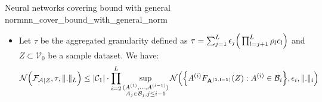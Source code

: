 \begin{theorem}{Neural networks covering bound with general norm}{nn_cover_bound_with_general_norm}
\begin{itemize}
        \item Let $\tau$ be the aggregated granularity defined as $\tau = \sum_{j=1}^L \epsilon_j \Big( \prod_{l=j+1}^L \rho_lc_l \Big)$ and $Z\subset\mathcal{V}_0$ be a sample dataset. We have:
        \begin{align*}
            \mathcal{N}\Big( 
                {\mathcal{F}_\mathcal{A}}_{|Z}, \tau, \|.\|_L
             \Big) \le |\mathcal{C}_1|\cdot\prod_{i=2}^L \sup_{\substack{
                (A^{(1)}, \dots, A^{(i-1)}) \\
                A_j \in \mathcal{B}_j, j \le i-1
            }}\mathcal{N}\Big( 
                \Big\{ A^{(i)}F_{\bf A^{(1, i-1)}}(Z) : A^{(i)} \in \mathcal{B}_i \Big\}, \epsilon_i, \|.\|_i
             \Big)
        \end{align*}
    \end{itemize}
\end{theorem}

